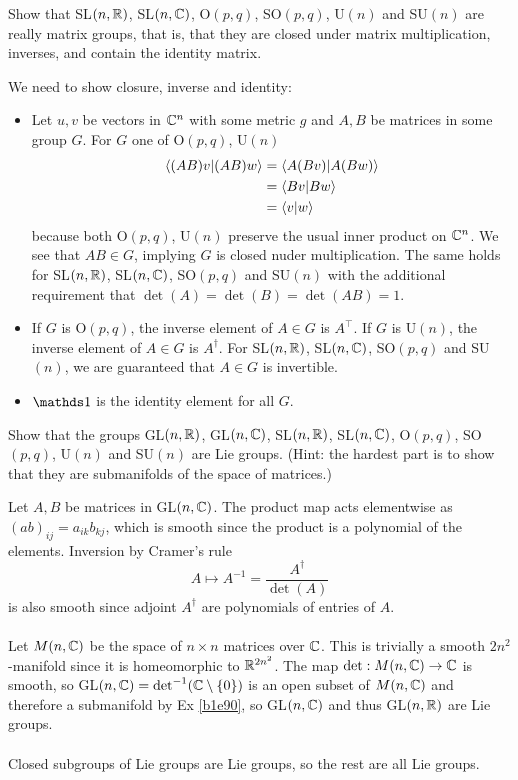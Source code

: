 \documentclass[10pt]{article}
\begin{document}
\begin{example}
	Show that SL$(n, \mathbb{R})$, SL$(n,\mathbb{C})$, O$(p,q)$, SO$(p,q)$, U$(n)$ and SU$(n)$ are really matrix groups, that is, that they are closed under matrix multiplication, inverses, and contain the identity matrix.
\end{example}
\sol We need to show closure, inverse and identity:
\begin{itemize}
	\item Let $u,v$ be vectors in $\mathbb{C}^n$ with some metric $g$ and $A, B$ be matrices in some group $G$. For $G$ one of O$(p,q)$, U$(n)$
	$$
	\begin{aligned}
		\ip{(AB)v}{(AB)w} &= \ip{A(Bv)}{A(Bw)}\\
		&= \ip{Bv}{Bw}\\ 
		&= \ip{v}{w}
	\end{aligned}
	$$
	because both O$(p,q)$, U$(n)$ preserve the usual inner product on $\mathbb{C}^n$. We see that $AB \in G$, implying $G$ is closed nuder multiplication. The same holds for SL$(n, \mathbb{R})$, SL$(n,\mathbb{C})$, SO$(p,q)$ and SU$(n)$ with the additional requirement that $\det (A) = \det (B) = \det (AB) = 1$.
	
	\item If $G$ is O$(p,q)$, the inverse element of $A \in G$ is $A^\intercal$. If $G$ is U$(n)$, the inverse element of $A \in G$ is $A^\dag$. For SL$(n, \mathbb{R})$, SL$(n,\mathbb{C})$, SO$(p,q)$ and SU$(n)$, we are guaranteed that $A \in G$ is invertible.
	
	\item $\id$ is the identity element for all $G$.
\end{itemize}


\begin{example}
	Show that the groups GL$(n, \mathbb{R})$, GL$(n,\mathbb{C})$, SL$(n, \mathbb{R})$, SL$(n,\mathbb{C})$, O$(p,q)$, SO$(p,q)$, U$(n)$ and SU$(n)$ are Lie groups. (Hint: the hardest part is to show that they are submanifolds of the space of matrices.)
\end{example}
\sol Let $A,B$ be matrices in GL$(n, \mathbb{C})$. The product map acts elementwise as $(ab)_{ij} = a_{ik}b_{kj}$, which is smooth since the product is a polynomial of the elements. Inversion by Cramer's rule
$$
A \mapsto A^{-1} = \frac{A^\dag}{\det (A)}
$$
is also smooth since adjoint $A^\dag$ are polynomials of entries of $A$.\\\\
Let $M(n,\mathbb{C})$ be the space of $n \times n$ matrices over $\mathbb{C}$. This is trivially a smooth $2n^2$-manifold since it is homeomorphic to $\mathbb{R}^{2n^2}$. The map $\det:M(n,\mathbb{C})\to \mathbb{C}$ is smooth, so GL$(n,\mathbb{C}) = \det^{-1}(\mathbb{C} \setminus \lbrace0\rbrace)$ is an open subset of $M(n,\mathbb{C})$ and therefore a submanifold by Ex \ref{b1e90}, so GL$(n,\mathbb{C})$ and thus GL$(n,\mathbb{R})$ are Lie groups.\\\\
Closed subgroups of Lie groups are Lie groups, so the rest are all Lie groups.
\end{document}
